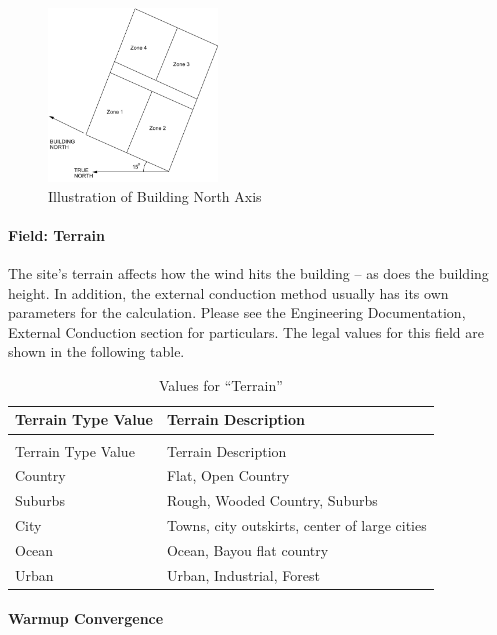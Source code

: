 \begin{figure}[hbtp] %
\centering
\includegraphics[width=0.4\textwidth, height=0.9\textheight, keepaspectratio=true]{media/image001.png}
\caption{Illustration of Building North Axis \protect \label{fig:illustration-of-building-north-axis}}
\end{figure}

\paragraph{Field: Terrain}\label{field-terrain}

The site's terrain affects how the wind hits the building -- as does the building height. In addition, the external conduction method usually has its own parameters for the calculation. Please see the Engineering Documentation, External Conduction section for particulars. The legal values for this field are shown in the following table.

\begin{longtable}[c]{@{}ll@{}}
\caption{Values for ``Terrain'' \label{table:values-for-terrain}} \tabularnewline
\toprule
Terrain Type Value & Terrain Description \tabularnewline
\midrule
\endfirsthead

\caption[]{Values for ``Terrain''} \tabularnewline
\toprule
Terrain Type Value & Terrain Description \tabularnewline
\midrule
\endhead

Country & Flat, Open Country \tabularnewline
Suburbs & Rough, Wooded Country, Suburbs \tabularnewline
City & Towns, city outskirts, center of large cities \tabularnewline
Ocean & Ocean, Bayou flat country \tabularnewline
Urban & Urban, Industrial, Forest \tabularnewline
\bottomrule
\end{longtable}

\paragraph{Warmup Convergence}\label{warmup-convergence}

